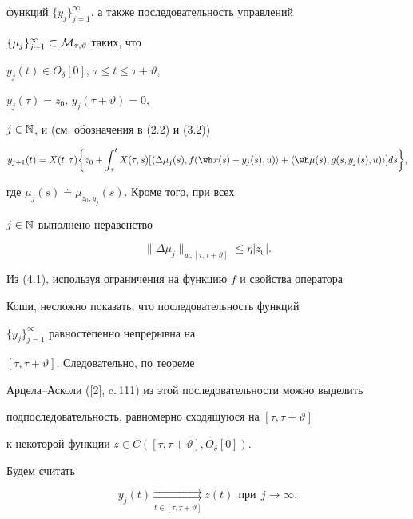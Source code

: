 функций $\{y_j\}_{j=1}^\infty$, а также последовательность управлений


$\{\mu_j\}_{j=1}^\infty\subset\cal M_{\tau,\vartheta}$ таких, что


$y_j(t)\in O_\delta[0]$, $\tau\le t\le\tau+\vartheta$,


$y_j(\tau)=z_0$, $y_j(\tau+\vartheta)=0$,


$j\in\Bbb N$, и (см. обозначения в (2.2) и (3.2))


\begin{equation}


y_{j+1}(t)=X(t,\tau)\bigg\{z_0+\int_\tau^tX(\tau,s)


[\langle\Delta\mu_{j}(s),f(\wh x(s)-y_{j}(s),u)\rangle+


\langle\wh\mu(s),g(s,y_{j}(s),u)\rangle]ds\bigg\},


\end{equation}


где $\mu_j(s)\doteq\mu_{z_0,y_{j}}(s)$. Кроме того, при всех


$j\in\Bbb N$ выполнено неравенство


\begin{equation}


\|\Delta\mu_{j}\|_{w,[\tau,\tau+\vartheta ]}\le\eta|z_0|.


\end{equation}


Из (4.1), используя ограничения на функцию $f$ и свойства оператора


Коши, несложно показать, что последовательность функций


$\{y_j\}_{j=1}^\infty$ равностепенно непрерывна на


$[\tau,\tau+\vartheta]$. Следовательно, по теореме


Арцела--Асколи ([2], c.\,111) из этой последовательности можно выделить


подпоследовательность, равномерно сходящуюся на $[\tau,\tau+\vartheta]$


к некоторой функции $z\in C([\tau,\tau+\vartheta],O_{\delta}[0])$. 


Будем считать


\begin{equation}


y_j(t)\underset{t\in[\tau,\tau+\vartheta]}{\rightrightarrows}{}


z(t)\ \ \text{при}\ \ j\to\infty.


\end{equation}


